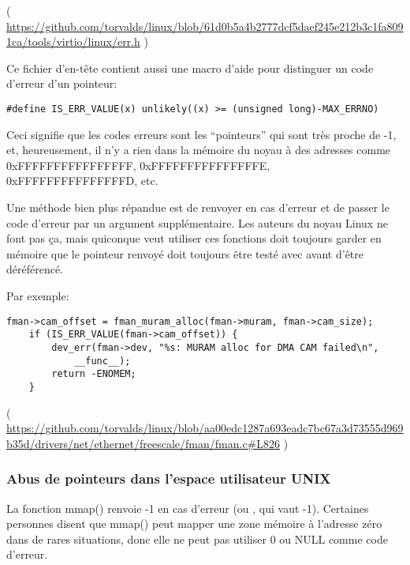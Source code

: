 ( \url{https://github.com/torvalds/linux/blob/61d0b5a4b2777dcf5daef245e212b3c1fa8091ca/tools/virtio/linux/err.h} )

Ce fichier d'en-tête contient aussi une macro d'aide pour distinguer un code d'erreur
d'un pointeur:

\begin{lstlisting}[style=customc]
#define IS_ERR_VALUE(x) unlikely((x) >= (unsigned long)-MAX_ERRNO)
\end{lstlisting}

Ceci signifie que les codes erreurs sont les ``pointeurs'' qui sont très proche de
-1, et, heureusement, il n'y a rien dans la mémoire du noyau à des adresses comme
0xFFFFFFFFFFFFFFFF, 0xFFFFFFFFFFFFFFFE, 0xFFFFFFFFFFFFFFFD, etc.

Une méthode bien plus répandue est de renvoyer  en cas d'erreur et de passer
le code d'erreur par un argument supplémentaire.
Les auteurs du noyau Linux ne font pas ça, mais quiconque veut utiliser ces fonctions
doit toujours garder en mémoire que le pointeur renvoyé doit toujours être testé avec
 avant d'être déréférencé.

Par exemple:

\begin{lstlisting}[style=customc]
	fman->cam_offset = fman_muram_alloc(fman->muram, fman->cam_size);
	if (IS_ERR_VALUE(fman->cam_offset)) {
		dev_err(fman->dev, "%s: MURAM alloc for DMA CAM failed\n",
			__func__);
		return -ENOMEM;
	}
\end{lstlisting}

( \url{https://github.com/torvalds/linux/blob/aa00edc1287a693eadc7bc67a3d73555d969b35d/drivers/net/ethernet/freescale/fman/fman.c#L826} )

\subsubsection{Abus de pointeurs dans l'espace utilisateur UNIX}

La fonction mmap() renvoie -1 en cas d'erreur (ou , qui vaut -1).
Certaines personnes disent que mmap() peut mapper une zone mémoire à l'adresse zéro
dans de rares situations, donc elle ne peut pas utiliser 0 ou NULL comme code d'erreur.

